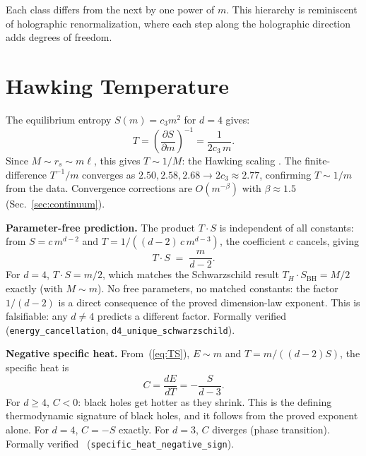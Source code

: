 \documentclass[aps,prl,twocolumn,superscriptaddress]{revtex4-2}
\begin{document}
Each class differs from the next by one power of $m$. This hierarchy
is reminiscent of holographic renormalization, where each step along
the holographic direction adds degrees of freedom.

\section{Hawking Temperature}

The equilibrium entropy $S(m) = c_3 m^2$ for $d=4$ gives:
\begin{equation}
\label{eq:hawking}
T = \left(\frac{\partial S}{\partial m}\right)^{-1}
  = \frac{1}{2 c_3 \, m}.
\end{equation}
Since $M \sim r_s \sim m\ell$, this gives $T \sim 1/M$: the Hawking
scaling \cite{Hawking1975}. The finite-difference $T^{-1}/m$ converges
as $2.50, 2.58, 2.68 \to 2c_3 \approx 2.77$, confirming $T \sim 1/m$
from the data. Convergence corrections are $O(m^{-\beta})$ with
$\beta \approx 1.5$ (Sec.~\ref{sec:continuum}).

\textbf{Parameter-free prediction.}
The product $T \cdot S$ is independent of all constants:
from $S = c\, m^{d-2}$ and $T = 1/((d{-}2)\, c\, m^{d-3})$,
the coefficient $c$ cancels, giving
\begin{equation}
\label{eq:TS}
T \cdot S \;=\; \frac{m}{d-2}.
\end{equation}
For $d = 4$, $T \cdot S = m/2$, which matches the Schwarzschild
result $T_H \cdot S_{\mathrm{BH}} = M/2$ exactly (with $M \sim m$).
No free parameters, no matched constants: the factor $1/(d{-}2)$
is a direct consequence of the proved dimension-law exponent.
This is falsifiable: any $d \neq 4$ predicts a different factor.
Formally verified~\cite{leanrepo}
(\texttt{energy\_cancellation}, \texttt{d4\_unique\_schwarzschild}).

\textbf{Negative specific heat.}
From~(\ref{eq:TS}), $E \sim m$ and $T = m/((d{-}2)S)$, the
specific heat is
\begin{equation}
C = \frac{dE}{dT} = -\frac{S}{d-3}.
\end{equation}
For $d \geq 4$, $C < 0$: black holes get hotter as they shrink.
This is the defining thermodynamic signature of black holes, and
it follows from the proved exponent alone.
For $d = 4$, $C = -S$ exactly.
For $d = 3$, $C$ diverges (phase transition).
Formally verified~\cite{leanrepo}
(\texttt{specific\_heat\_negative\_sign}).
\end{document}
